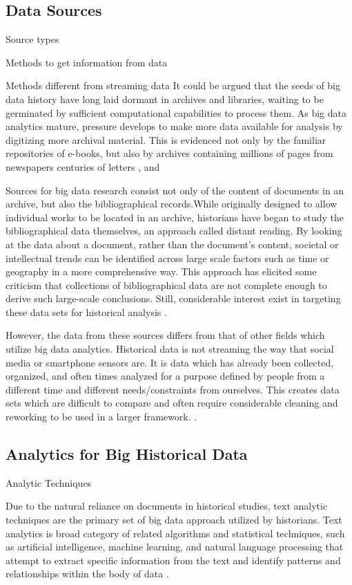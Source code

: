 \documentclass[sigconf]{acmart}
\begin{document}
\subsection{Data Sources}
Source types

Methods to get information from data

Methods different from streaming data
It could be argued that the seeds of big data history have long laid dormant in  archives and libraries, waiting to be germinated by sufficient computational capabilities to process them. As big data analytics mature, pressure develops to make more data available for analysis by digitizing more archival material. This is evidenced not only by the familiar repositories of e-books, but also by archives containing millions of pages from newspapers \cite{bdglobalhist} centuries of letters \cite{digitalrepublicletters}, and 

Sources for big data research consist not only of the content of documents in an archive, but also the bibliographical records.While originally designed to allow individual works to be located in an archive, historians have began to study the bibliographical data themselves, an approach called distant reading. By looking at the data about a document, rather than the document's content, societal or intellectual trends can be identified across large scale factors such as time or geography in a more comprehensive way. This approach has elicited some criticism that collections of bibliographical data are not complete enough to derive such large-scale conclusions. Still, considerable interest exist in targeting these data sets for historical analysis \cite{musichist}.

However, the data from these sources differs from that of other fields which utilize big data analytics. Historical data is not streaming the way that social media or smartphone sensors are. It is data which has already been collected, organized, and often times analyzed for a purpose defined by people from a different time and different needs/constraints from ourselves. This creates data sets which are difficult to compare and often require considerable cleaning and reworking to be used in a larger framework. \cite{digitalrepublicletters}.

\subsection{Analytics for Big Historical Data}
Analytic Techniques 

Due to the natural reliance on documents in historical studies, text analytic techniques are the primary set of big data approach utilized by historians. Text analytics is broad category of related algorithms and statistical techniques, such as artificial intelligence, machine learning, and natural language processing that attempt to extract specific information from the text and identify patterns and relationships within the body of data \cite{bdglobalhist}. 
\end{document}
